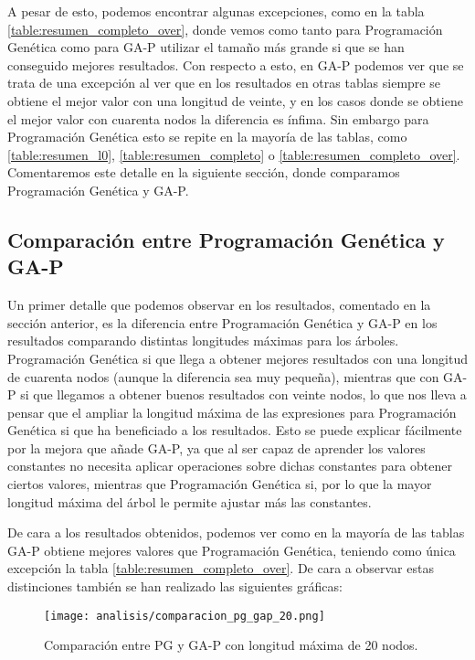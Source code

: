 A pesar de esto, podemos encontrar algunas excepciones, como en la tabla \ref{table:resumen_completo_over}, donde vemos como tanto para Programación Genética como para GA-P utilizar el tamaño más grande si que se han conseguido mejores resultados. Con respecto a esto, en GA-P podemos ver que se trata de una excepción al ver que en los resultados en otras tablas siempre se obtiene el mejor valor con una longitud de veinte, y en los casos donde se obtiene el mejor valor con cuarenta nodos la diferencia es ínfima. Sin embargo para Programación Genética esto se repite en la mayoría de las tablas, como \ref{table:resumen_l0}, \ref{table:resumen_completo} o \ref{table:resumen_completo_over}. Comentaremos este detalle en la siguiente sección, donde comparamos Programación Genética y GA-P.

\newpage

\subsection{Comparación entre Programación Genética y GA-P}

Un primer detalle que podemos observar en los resultados, comentado en la sección anterior, es la diferencia entre Programación Genética y GA-P en los resultados comparando distintas longitudes máximas para los árboles. Programación Genética si que llega a obtener mejores resultados con una longitud de cuarenta nodos (aunque la diferencia sea muy pequeña), mientras que con GA-P si que llegamos a obtener buenos resultados con veinte nodos, lo que nos lleva a pensar que el ampliar la longitud máxima de las expresiones para Programación Genética si que ha beneficiado a los resultados. Esto se puede explicar fácilmente por la mejora que añade GA-P, ya que al ser capaz de aprender los valores constantes no necesita aplicar operaciones sobre dichas constantes para obtener ciertos valores, mientras que Programación Genética si, por lo que la mayor longitud máxima del árbol le permite ajustar más las constantes.

De cara a los resultados obtenidos, podemos ver como en la mayoría de las tablas GA-P obtiene mejores valores que Programación Genética, teniendo como única excepción la tabla \ref{table:resumen_completo_over}. De cara a observar estas distinciones también se han realizado las siguientes gráficas:

\begin{figure}[H]
    \centering
	  \texttt{[image: analisis/comparacion\_pg\_gap\_20.png]}
	  \caption{Comparación entre PG y GA-P con longitud máxima de 20 nodos.}\label{fig:cmp_pg_gap_20}

\end{figure}

